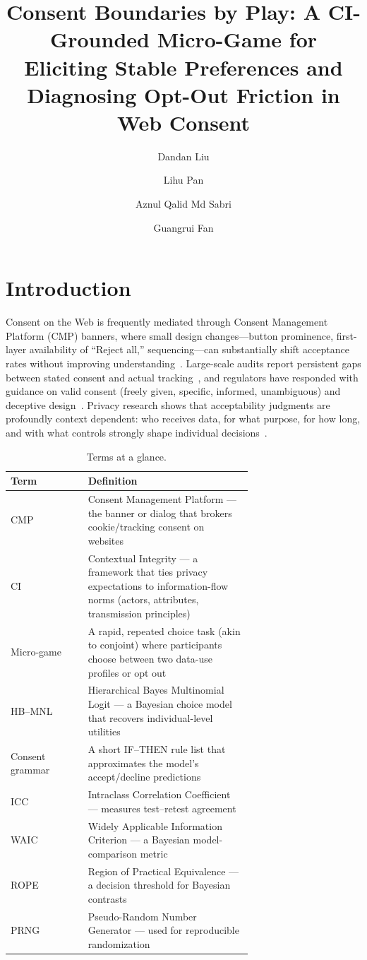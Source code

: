 \documentclass{eusset}
\title{Consent Boundaries by Play: A CI-Grounded Micro-Game for Eliciting Stable Preferences and Diagnosing Opt-Out Friction in Web Consent}
\author{Dandan Liu}
\affiliation{
  \institution{Universiti Malaya}
  \country{Malaysia}
}
\author{Lihu Pan}
\affiliation{
  \institution{Taiyuan University of Science and Technology}
  \country{China}
}
\author{Aznul Qalid Md Sabri}
\affiliation{
  \institution{University of Malaya}
  \country{Malaysia}
}
\author{Guangrui Fan}
\affiliation{
  \institution{Taiyuan University of Science and Technology}
  \country{China}
}
\begin{document}
\section{Introduction}

Consent on the Web is frequently mediated through Consent Management Platform (CMP) banners, where small design changes---button prominence, first-layer availability of ``Reject all,'' sequencing---can substantially shift acceptance rates without improving understanding~\citep{Nouwens2020CHI,Habib2022CHI,Bielova2024USENIX,Berens2024CoSe}. Large-scale audits report persistent gaps between stated consent and actual tracking~\citep{Smith2024WWWTCF,demir2024large}, and regulators have responded with guidance on valid consent (freely given, specific, informed, unambiguous) and deceptive design~\citep{EDPB2023DarkPatterns,EDPB2020Consent,ICO_CMA_2023_HarmfulDesign,FTC2022DarkPatterns,CPPA2024Advisory}. Privacy research shows that acceptability judgments are profoundly context dependent: who receives data, for what purpose, for how long, and with what controls strongly shape individual decisions~\citep{Nissenbaum2004ContextualIntegrity,MartinNissenbaum2016MeasuringPrivacy,Gupta2023ConsumerViewsJAMA}.

\begin{table}[t]
\centering
\small
\begin{tabular}{@{} l p{0.68\linewidth} @{}}
\textbf{Term} & \textbf{Definition} \\
\hline
CMP & Consent Management Platform --- the banner or dialog that brokers cookie/tracking consent on websites \\
CI & Contextual Integrity --- a framework that ties privacy expectations to information-flow norms (actors, attributes, transmission principles)~\citep{Nissenbaum2004ContextualIntegrity} \\
Micro-game & A rapid, repeated choice task (akin to conjoint) where participants choose between two data-use profiles or opt out \\
HB--MNL & Hierarchical Bayes Multinomial Logit --- a Bayesian choice model that recovers individual-level utilities \\
Consent grammar & A short IF--THEN rule list that approximates the model's accept/decline predictions \\
ICC & Intraclass Correlation Coefficient --- measures test--retest agreement \\
WAIC & Widely Applicable Information Criterion --- a Bayesian model-comparison metric \\
ROPE & Region of Practical Equivalence --- a decision threshold for Bayesian contrasts \\
PRNG & Pseudo-Random Number Generator --- used for reproducible randomization \\
\end{tabular}
\caption{Terms at a glance.}\label{tab:glossary}
\end{table}
\end{document}
